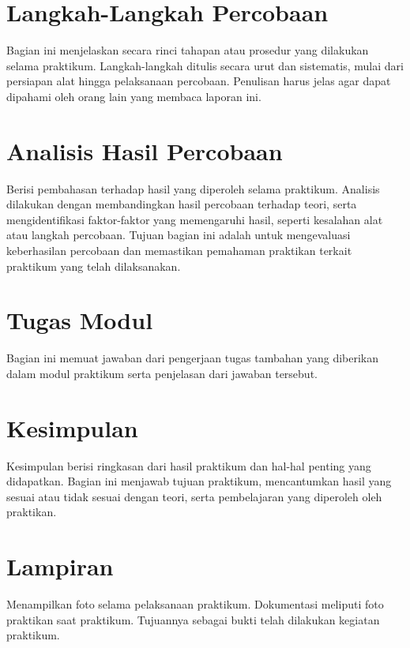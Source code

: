 \section{Langkah-Langkah Percobaan}
Bagian ini menjelaskan secara rinci tahapan atau prosedur yang dilakukan selama praktikum. Langkah-langkah ditulis secara urut dan sistematis, mulai dari persiapan alat hingga pelaksanaan percobaan. Penulisan harus jelas agar dapat dipahami oleh orang lain yang membaca laporan ini.

\section{Analisis Hasil Percobaan}
Berisi pembahasan terhadap hasil yang diperoleh selama praktikum. Analisis dilakukan dengan membandingkan hasil percobaan terhadap teori, serta mengidentifikasi faktor-faktor yang memengaruhi hasil, seperti kesalahan alat atau langkah percobaan. Tujuan bagian ini adalah untuk mengevaluasi keberhasilan percobaan dan memastikan pemahaman praktikan terkait praktikum yang telah dilaksanakan.

\section{Tugas Modul}
Bagian ini memuat jawaban dari pengerjaan tugas tambahan yang diberikan dalam modul praktikum serta penjelasan dari jawaban tersebut. 

\section{Kesimpulan}
Kesimpulan berisi ringkasan dari hasil praktikum dan hal-hal penting yang didapatkan. Bagian ini menjawab tujuan praktikum, mencantumkan hasil yang sesuai atau tidak sesuai dengan teori, serta pembelajaran yang diperoleh oleh praktikan.

\section{Lampiran}
Menampilkan foto selama pelaksanaan praktikum. Dokumentasi meliputi foto praktikan saat praktikum. Tujuannya sebagai bukti telah dilakukan kegiatan praktikum.